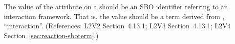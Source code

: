 The value of the  attribute on a \Reaction should
be an SBO identifier referring to an interaction framework.  That
is, the value should be a term derived from \sbointeractionID,
``interaction''.  (References: L2V2 Section~4.13.1; L2V3
Section~4.13.1; L2V4 Section~\ref{sec:reaction-sboterm}.)
